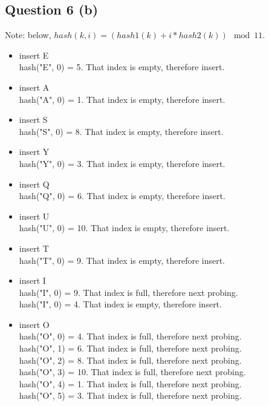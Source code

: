 \documentclass[11pt]{article}
\begin{document}
\subsection{Question 6 (b)}
Note: below, $hash(k, i) =  (hash1(k) + i * hash2(k)) \mod 11$.
\begin{itemize}
\item insert E\\
hash("E", 0) = 5. That index is empty, therefore insert.\\
\item insert A\\
hash("A", 0) = 1. That index is empty, therefore insert.\\
\item insert S\\
hash("S", 0) = 8. That index is empty, therefore insert.\\
\item insert Y\\
hash("Y", 0) = 3. That index is empty, therefore insert.\\
\item insert Q\\
hash("Q", 0) = 6. That index is empty, therefore insert.\\
\item insert U\\
hash("U", 0) = 10. That index is empty, therefore insert.\\
\item insert T\\
hash("T", 0) = 9. That index is empty, therefore insert.\\
\item insert I\\
hash("I", 0) = 9. That index is full, therefore next probing.\\
hash("I", 0) = 4. That index is empty, therefore insert.\\
\item insert O\\
hash("O", 0) = 4. That index is full, therefore next probing.\\
hash("O", 1) = 6. That index is full, therefore next probing.\\
hash("O", 2) = 8. That index is full, therefore next probing.\\
hash("O", 3) = 10. That index is full, therefore next probing.\\
hash("O", 4) = 1. That index is full, therefore next probing.\\
hash("O", 5) = 3. That index is full, therefore next probing.\\

\end{itemize}
\end{document}
